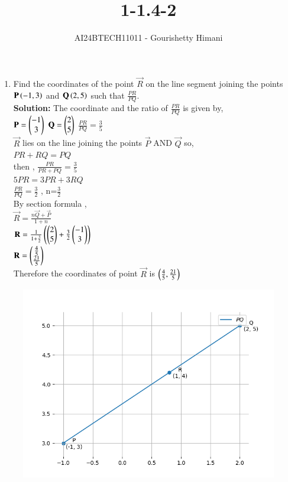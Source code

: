 \documentclass[journal,12pt,onecolumn]{IEEEtran}
\theoremstyle{remark}
\begin{document}

\vspace{3cm}

\title{1-1.4-2}
\author{AI24BTECH11011 - Gourishetty Himani}
\maketitle	
\bigskip

\renewcommand{\thefigure}{\theenumi}
\renewcommand{\thetable}{\theenumi}
\begin{enumerate}

 \item Find the coordinates of the point $\vec{R}$ on the line segment joining the points $\mathbf{P}\left(-1,3\right)$ and $\mathbf{Q}\left(2,5\right)$ such that $\frac{PR}{PQ}$.\\
 \textbf{Solution:} The coordinate and the ratio of $\frac{PR}{PQ}$ is given by, \\ 
 $\mathbf{P}=\begin{pmatrix}-1 \\ 3\end{pmatrix}$ $\mathbf{Q}=\begin{pmatrix}2 \\ 5\end{pmatrix}$ $\frac{PR}{PQ}=\frac{3}{5}$\\
 $\vec{R}$ lies on the line joining the points $\vec{P}$ AND $\vec{Q}$ so,\\ $PR + RQ = PQ$\\ then , $\frac{PR}{PR+PQ}=\frac{3}{5}$\\ $5PR=3PR+3RQ$ \\$\frac{PR}{PQ}=\frac{3}{2}$ , n=$\frac{3}{2}$\\By section formula ,\\ $\vec{R}=\frac{n\vec{Q}+\vec{P}}{1+n}$\\
 $\mathbf{R}=\frac{1}{1+\frac{3}{2}}\left(\begin{pmatrix}2 \\ 5\end{pmatrix}+\frac{3}{2}\begin{pmatrix}-1 \\ 3\end{pmatrix}\right)$\\
 $\mathbf{R}=\begin{pmatrix}\frac{4}{5}\\\frac{21}{5}\end{pmatrix}$\\
 Therefore the coordinates of point $\vec{R}$ is $\left(\frac{4}{5},\frac{21}{5}\right)$
\end{enumerate}
\begin{figure}[h!]
\centering
\includegraphics[width=0.7\linewidth]{figs/plot1.png}
\label{fig1}
\end{figure}
\end{document}
